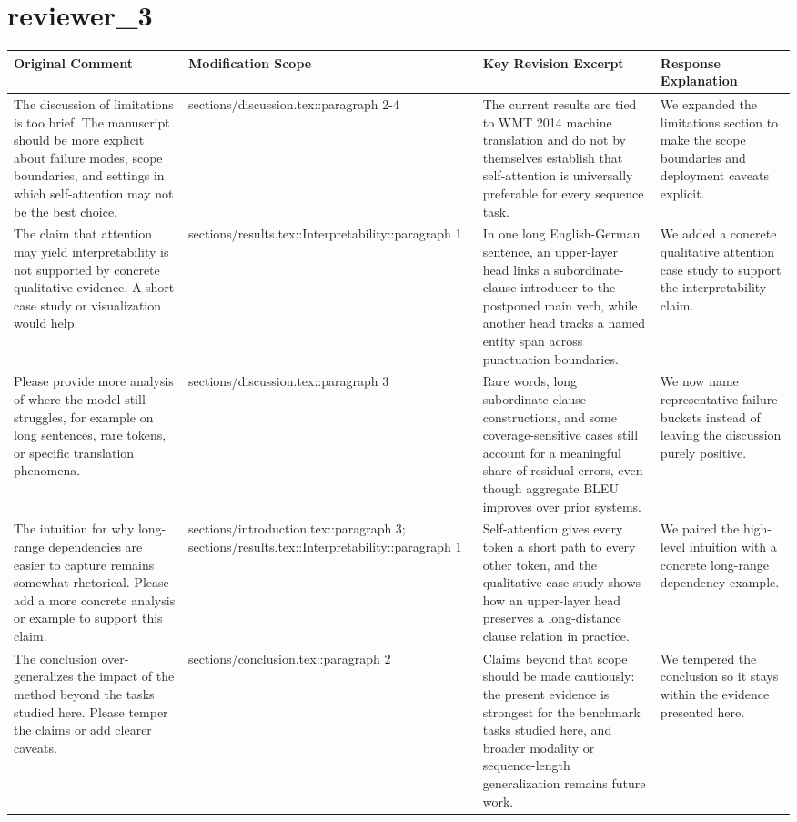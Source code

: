 \documentclass{article}
\begin{document}
\section*{ reviewer\_3 }
\begin{longtable}{|p{}|p{}|p{}|p{}|}
\hline
Original Comment & Modification Scope & Key Revision Excerpt & Response Explanation \\
\hline
The discussion of limitations is too brief. The manuscript should be more explicit about failure modes, scope boundaries, and settings in which self-attention may not be the best choice. & sections/discussion.tex::paragraph 2-4 & The current results are tied to WMT 2014 machine translation and do not by themselves establish that self-attention is universally preferable for every sequence task. & We expanded the limitations section to make the scope boundaries and deployment caveats explicit. \\
\hline
The claim that attention may yield interpretability is not supported by concrete qualitative evidence. A short case study or visualization would help. & sections/results.tex::Interpretability::paragraph 1 & In one long English-German sentence, an upper-layer head links a subordinate-clause introducer to the postponed main verb, while another head tracks a named entity span across punctuation boundaries. & We added a concrete qualitative attention case study to support the interpretability claim. \\
\hline
Please provide more analysis of where the model still struggles, for example on long sentences, rare tokens, or specific translation phenomena. & sections/discussion.tex::paragraph 3 & Rare words, long subordinate-clause constructions, and some coverage-sensitive cases still account for a meaningful share of residual errors, even though aggregate BLEU improves over prior systems. & We now name representative failure buckets instead of leaving the discussion purely positive. \\
\hline
The intuition for why long-range dependencies are easier to capture remains somewhat rhetorical. Please add a more concrete analysis or example to support this claim. & sections/introduction.tex::paragraph 3; sections/results.tex::Interpretability::paragraph 1 & Self-attention gives every token a short path to every other token, and the qualitative case study shows how an upper-layer head preserves a long-distance clause relation in practice. & We paired the high-level intuition with a concrete long-range dependency example. \\
\hline
The conclusion over-generalizes the impact of the method beyond the tasks studied here. Please temper the claims or add clearer caveats. & sections/conclusion.tex::paragraph 2 & Claims beyond that scope should be made cautiously: the present evidence is strongest for the benchmark tasks studied here, and broader modality or sequence-length generalization remains future work. & We tempered the conclusion so it stays within the evidence presented here. \\
\hline
\end{longtable}
\end{document}
